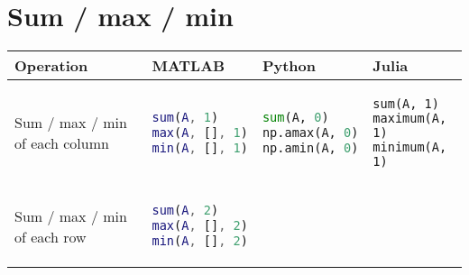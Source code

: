 \section{Sum / max / min}\label{sum-max-min}

\begin{tabular}[]{@{}llll@{}}
\toprule
\begin{minipage}[b]{0.23\columnwidth}\raggedright
Operation
\end{minipage} & \begin{minipage}[b]{0.22\columnwidth}\raggedright
MATLAB
\end{minipage} & \begin{minipage}[b]{0.24\columnwidth}\raggedright
Python
\end{minipage} & \begin{minipage}[b]{0.20\columnwidth}\raggedright
Julia
\end{minipage}\tabularnewline
\midrule
\begin{minipage}[t]{0.23\columnwidth}\raggedright
Sum / max / min of each column
\end{minipage} & \begin{minipage}[t]{0.22\columnwidth}\raggedright
\begin{lstlisting}[language=Matlab]
sum(A, 1)
max(A, [], 1)
min(A, [], 1)
\end{lstlisting}

\end{minipage} & \begin{minipage}[t]{0.24\columnwidth}\raggedright
\begin{lstlisting}[language=Python]
sum(A, 0)
np.amax(A, 0)
np.amin(A, 0)
\end{lstlisting}

\end{minipage} & \begin{minipage}[t]{0.20\columnwidth}\raggedright
\begin{lstlisting}
sum(A, 1)
maximum(A, 1)
minimum(A, 1)
\end{lstlisting}

\end{minipage}\tabularnewline
\begin{minipage}[t]{0.23\columnwidth}\raggedright
Sum / max / min of each row
\end{minipage} & \begin{minipage}[t]{0.22\columnwidth}\raggedright
\begin{lstlisting}[language=Matlab]
sum(A, 2)
max(A, [], 2)
min(A, [], 2)
\end{lstlisting}


\end{minipage}
\end{tabular}

